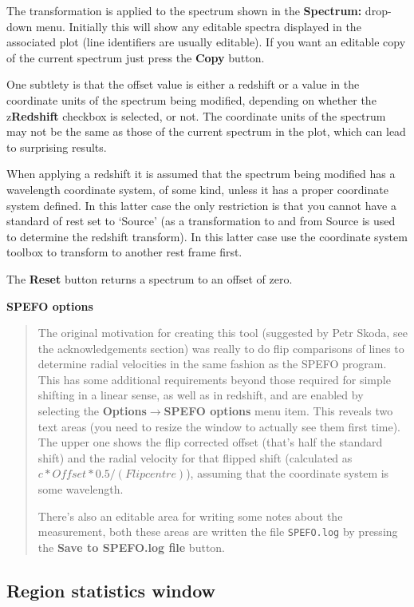 \documentclass[twoside,11pt]{article}
\newcommand{\latexhtml}[2]{#1}
\renewcommand{\_}{\texttt{\symbol{95}}}
\newcommand{\submenuitem}[2]{\latexhtml{\textbf{#1$\rightarrow$#2}}{\textbf{#1->#2}}}
\newcommand{\labelitem}[1]{\textbf{#1}}
\newcommand{\hitext}[1]{\texttt{#1}}
\newcommand{\subheading}[1]{\textbf{\large{#1}}}
\begin{document}
The transformation is applied to the spectrum shown in the
\labelitem{Spectrum:} drop-down menu. Initially this will show any editable
spectra displayed in the associated plot (line identifiers are usually
editable). If you want an editable copy of the current spectrum just press the
\labelitem{Copy} button.

One subtlety is that the offset value is either a redshift or a value in the
coordinate units of the spectrum being modified, depending on whether the
z\labelitem{Redshift} checkbox is selected, or not. The coordinate units of
the spectrum may not be the same as those of the current spectrum in the plot,
which can lead to surprising results.

When applying a redshift it is assumed that the spectrum being modified has a
wavelength coordinate system, of some kind, unless it has a proper coordinate
system defined. In this latter case the only restriction is that you cannot
have a standard of rest set to `Source' (as a transformation to and from
Source is used to determine the redshift transform). In this latter case use
the coordinate system toolbox to transform to another rest frame first.

The \labelitem{Reset} button returns a spectrum to an offset of zero.

\subheading{SPEFO options}
\begin{quote}
The original motivation for creating this tool (suggested by Petr Skoda, see
the acknowledgements section) was really to do flip comparisons of lines to
determine radial velocities in the same fashion as the SPEFO program. This has
some additional requirements beyond those required for simple shifting in a
linear sense, as well as in redshift, and are enabled by selecting the
\submenuitem{Options}{SPEFO options} menu item. This reveals two text areas
(you need to resize the window to actually see them first time). The upper one
shows the flip corrected offset (that's half the standard shift) and the
radial velocity for that flipped shift (calculated as $c*Offset*0.5/(Flip
centre)$), assuming that the coordinate system is some wavelength.

There's also an editable area for writing some notes about the measurement,
both these areas are written the file \hitext{SPEFO.log} by pressing the
\labelitem{Save to SPEFO.log file} button.

\end{quote}


\newpage
\subsection{Region statistics window}
\end{document}
